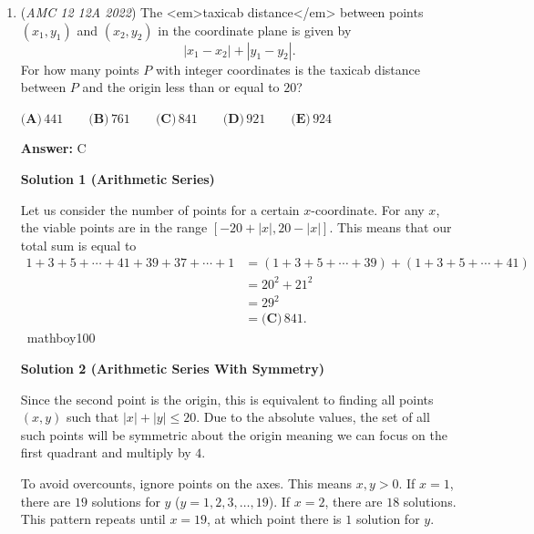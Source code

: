 \begin{enumerate}
\textbf{Solution 2}

The options for $\text{lcm}(x, 18)=180$ are $20$, $60$, and $180$. The options for $\text{gcd}(y, 45)=15$ are $15$, $30$, $60$, $75$, etc. We see that $60$ appears in both lists; therefore, $6+0=\boxed{\textbf{(B) } 6}$.

 \textbf{Remark} If you ignore or mess up the LCM, and get  $n=15$, you'll still get the correct answer.

 


	\item (\textit{AMC 12 12A 2022}) The <em>taxicab distance</em> between points $(x_1, y_1)$ and $(x_2, y_2)$ in the coordinate plane is given by 
 \[|x_1 - x_2| + |y_1 - y_2|.\]
For how many points $P$ with integer coordinates is the taxicab distance between $P$ and the origin less than or equal to $20$?


 $\textbf{(A)} \, 441 \qquad\textbf{(B)} \, 761 \qquad\textbf{(C)} \, 841 \qquad\textbf{(D)} \, 921  \qquad\textbf{(E)} \, 924$

 \textbf{Answer: }C



\textbf{Solution 1 (Arithmetic Series)}

Let us consider the number of points for a certain $x$-coordinate. For any $x$, the viable points are in the range $[-20 + |x|, 20 - |x|]$. This means that our total sum is equal to 
 \begin{align*} 1 + 3 + 5 + \cdots + 41 + 39 + 37 + \cdots + 1 &= (1 + 3 + 5 + \cdots + 39) + (1 + 3 + 5 + \cdots + 41) \\ & = 20^2 + 21^2 \\ & = 29^2 \\ &= \boxed{\textbf{(C)} \, 841}. \end{align*}
~mathboy100

 



\textbf{Solution 2 (Arithmetic Series With Symmetry)}

Since the second point is the origin, this is equivalent to finding all points $(x, y)$ such that $|x| + |y| \leq 20$. Due to the absolute values, the set of all such points will be symmetric about the origin meaning we can focus on the first quadrant and multiply by $4$.

 To avoid overcounts, ignore points on the axes. This means $x, y > 0$. If $x = 1$, there are $19$ solutions for $y$ ($y = 1, 2, 3, \ldots, 19$). If $x = 2$, there are $18$ solutions. This pattern repeats until $x = 19$, at which point there is $1$ solution for $y$.


\end{enumerate}
